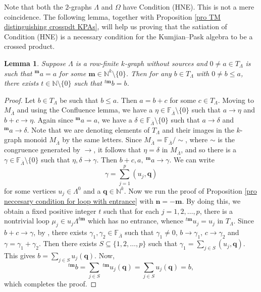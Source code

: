 \documentclass[a4paper,reqno,12pt]{amsart}
\numberwithin{equation}{section}
\newtheorem{lem}[thm]{Lemma}
\theoremstyle{definition}
\theoremstyle{remark}
\newcommand{\N}{\mathbf{n}}
\newcommand{\M}{\mathbf{m}}
\newcommand{\Q}{\mathbf{q}}
\begin{document}
Note that both the $2$-graphs $\Lambda$ and $\Omega$ have Condition (HNE). This is not a mere coincidence. The following lemma, together with Proposition \ref{pro TM distinguishing crosspdt KPAs}, will help us proving that the satiation of Condition (HNE) is a necessary condition for the Kumjian--Pask algebra to be a crossed product.

\begin{lem}\label{lem downset of periodic element}
Suppose $\Lambda$ is a row-finite $k$-graph without sources and $0\neq a\in T_\Lambda$ is such that $^\M a=a$ for some $\M\in \mathbb{N}^k\setminus \{0\}$. Then for any $b\in T_\Lambda$ with $0\neq b\le a$, there exists $t\in \mathbb{N}\setminus \{0\}$ such that $^{t\M} b=b$. 
\end{lem}
\begin{proof}
Let $b\in T_\Lambda$ be such that $b\le a$. Then $a=b+c$ for some $c\in T_\Lambda$. Moving to $M_{\overline{\Lambda}}$ and using the Confluence lemma, we have a $\eta\in \mathbb{F}_{\overline{\Lambda}}\setminus \{0\}$ such that $a\longrightarrow \eta$ and $b+c\longrightarrow \eta$. Again since $^\M a=a$, we have a $\delta\in \mathbb{F}_{\overline{\Lambda}}\setminus \{0\}$ such that $a\longrightarrow \delta$ and $^\M a\longrightarrow \delta$. Note that we are denoting elements of $T_\Lambda$ and their images in the $k$-graph monoid $M_{\overline{\Lambda}}$ by the same letters. Since $M_{\overline{\Lambda}}=\mathbb{F}_{\overline{\Lambda}}/\sim$, where $\sim$ is the congruence generated by $\longrightarrow$, it follows that $\eta=\delta$ in $M_{\overline{\Lambda}}$, and so there is a $\gamma\in \mathbb{F}_{\overline{\Lambda}}\setminus \{0\}$ such that $\eta,\delta\longrightarrow \gamma$. Then $b+c,a,~^\M a\longrightarrow \gamma$. We can write \[\gamma=\displaystyle{\sum_{j=1}^{p}} (u_j,\mathbf{q})\] for some vertices $u_j\in \Lambda^0$ and a $\Q\in \mathbb{N}^k$. Now we run the proof of Proposition \ref{pro neccesary condition for loop with entrance} with $\N=-\M$. By doing this, we obtain a fixed positive integer $t$ such that for each $j=1,2,\ldots,p$, there is a nontrivial loop $\mu_j\in u_j\Lambda^{t\M}$ which has no entrance, whence $^{t\M}u_j=u_j$ in $T_\Lambda$. Since $b+c\longrightarrow \gamma$, by \cite[Lemma 3.1]{HMPS1}, there exists $\gamma_1,\gamma_2\in \mathbb{F}_{\overline{\Lambda}}$ such that $\gamma_1\neq 0$, $b\longrightarrow \gamma_1$, $c\longrightarrow \gamma_2$ and $\gamma=\gamma_1+\gamma_2$. Then there exists $S\subseteq \{1,2,\ldots,p\}$ such that $\gamma_1=\displaystyle{\sum_{j\in S}} (u_j,\Q)$. This gives $b=\displaystyle{\sum_{j\in S}} u_{j}(\Q)$. Now, \[^{t\M}b=\displaystyle{\sum_{j\in S}}~^{t\M}u_{j}(\Q)=\displaystyle{\sum_{j\in S}} u_{j}(\Q)=b,\] which completes the proof.  
\end{proof}
\end{document}
